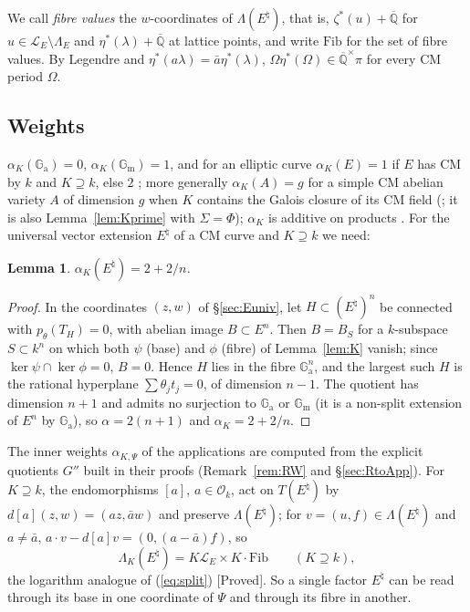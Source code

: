 \documentclass[11pt]{amsart}
\newtheorem{lemma}[theorem]{Lemma}
\theoremstyle{definition}
\newcommand{\Qb}{\overline{\mathbb{Q}}}
\newcommand{\Ga}{\mathbb{G}_{\mathrm a}}
\newcommand{\Gm}{\mathbb{G}_{\mathrm m}}
\newcommand{\Lg}{\mathcal{L}}
\newcommand{\Fib}{\mathrm{Fib}}
\newcommand{\lab}[1]{\textup{[#1]}}
\begin{document}
We call \emph{fibre values} the $w$-coordinates of $\Lambda(E^\natural)$, that is, $\zeta^*(u)+\Qb$ for
$u\in\Lg_E\setminus\Lambda_E$ and $\eta^*(\lambda)+\Qb$ at lattice points, and write $\Fib$ for the set of fibre values. By
Legendre and $\eta^*(a\lambda)=\bar a\eta^*(\lambda)$, $\Omega\eta^*(\Omega)\in\Qb^\times\pi$ for every CM period $\Omega$.

\subsection{Weights}\label{sec:weights}
$\alpha_K(\Ga)=0$, $\alpha_K(\Gm)=1$, and for an elliptic curve $\alpha_K(E)=1$ if $E$ has CM by $k$ and $K\supseteq k$, else
$2$ \cite[Lemme, p.~361]{RW93}; more generally $\alpha_K(A)=g$ for a simple CM abelian variety $A$ of dimension $g$ when
$K$ contains the Galois closure of its CM field (\cite[Lemme, p.~361]{RW93}; it is also Lemma~\ref{lem:Kprime} with
$\Sigma=\Phi$); $\alpha_K$ is additive on products \cite[(2)]{RW93}. For the universal vector extension $E^\natural$ of a CM
curve and $K\supseteq k$ we need:

\begin{lemma}\label{lem:natural}
$\alpha_K(E^\natural)=2+2/n$.
\end{lemma}

\begin{proof}
In the coordinates $(z,w)$ of \S\ref{sec:Euniv}, let $H\subset(E^\natural)^n$ be connected with $p_\theta(T_H)=0$, with
abelian image $B\subset E^n$. Then $B=B_S$ for a $k$-subspace $S\subset k^n$ on which both $\psi$ (base) and $\phi$ (fibre)
of Lemma~\ref{lem:K} vanish; since $\ker\psi\cap\ker\phi=0$, $B=0$. Hence $H$ lies in the fibre $\Ga^n$, and the largest
such $H$ is the rational hyperplane $\sum\theta_jt_j=0$, of dimension $n-1$. The quotient
has dimension $n+1$ and admits no surjection to $\Ga$ or $\Gm$ (it is a non-split extension of $E^n$ by $\Ga$), so
$\alpha=2(n+1)$ and $\alpha_K=2+2/n$.
\end{proof}

\noindent The inner weights $\alpha_{K,\Psi}$ of the applications are computed from the explicit quotients $G''$ built in
their proofs (Remark~\ref{rem:RW} and \S\ref{sec:RtoApp}). For $K\supseteq k$, the endomorphisms $[a]$, $a\in\mathcal O_k$,
act on $T(E^\natural)$ by $d[a](z,w)=(az,\bar aw)$ and preserve $\Lambda(E^\natural)$; for $v=(u,f)\in\Lambda(E^\natural)$
and $a\ne\bar a$, $a\cdot v-d[a]v=(0,(a-\bar a)f)$, so
\begin{equation}\label{eq:splitL}
\Lambda_K(E^\natural)=K\Lg_E\times K\cdot\Fib\qquad(K\supseteq k),
\end{equation}
the logarithm analogue of (\ref{eq:split}) \lab{Proved}. So a single factor $E^\natural$ can be read through its base in one
coordinate of $\Psi$ and through its fibre in another.
\end{document}
